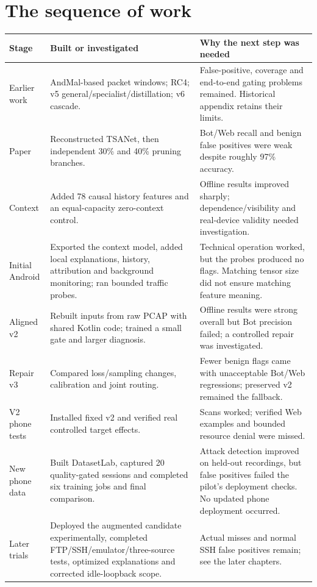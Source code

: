 \documentclass[11pt,a4paper,oneside]{report}
\begin{document}
\section{The sequence of work}
\begin{longtable}{p{}p{}p{}}
\toprule Stage & Built or investigated & Why the next step was needed\\\midrule\endhead
Earlier work & AndMal-based packet windows; RC4; v5 general/specialist/distillation; v6 cascade. & False-positive, coverage and end-to-end gating problems remained. Historical appendix retains their limits.\\
Paper & Reconstructed TSANet, then independent 30\% and 40\% pruning branches. & Bot/Web recall and benign false positives were weak despite roughly 97\% accuracy.\\
Context & Added 78 causal history features and an equal-capacity zero-context control. & Offline results improved sharply; dependence/visibility and real-device validity needed investigation.\\
Initial Android & Exported the context model, added local explanations, history, attribution and background monitoring; ran bounded traffic probes. & Technical operation worked, but the probes produced no flags. Matching tensor size did not ensure matching feature meaning.\\
Aligned v2 & Rebuilt inputs from raw PCAP with shared Kotlin code; trained a small gate and larger diagnosis. & Offline results were strong overall but Bot precision failed; a controlled repair was investigated.\\
Repair v3 & Compared loss/sampling changes, calibration and joint routing. & Fewer benign flags came with unacceptable Bot/Web regressions; preserved v2 remained the fallback.\\
V2 phone tests & Installed fixed v2 and verified real controlled target effects. & Scans worked; verified Web examples and bounded resource denial were missed.\\
New phone data & Built DatasetLab, captured 20 quality-gated sessions and completed six training jobs and final comparison. & Attack detection improved on held-out recordings, but false positives failed the pilot's deployment checks. No updated phone deployment occurred.\\
Later trials & Deployed the augmented candidate experimentally, completed FTP/SSH/emulator/three-source tests, optimized explanations and corrected idle-loopback scope. & Actual misses and normal SSH false positives remain; see the later chapters.\\
\bottomrule
\end{longtable}
\end{document}
